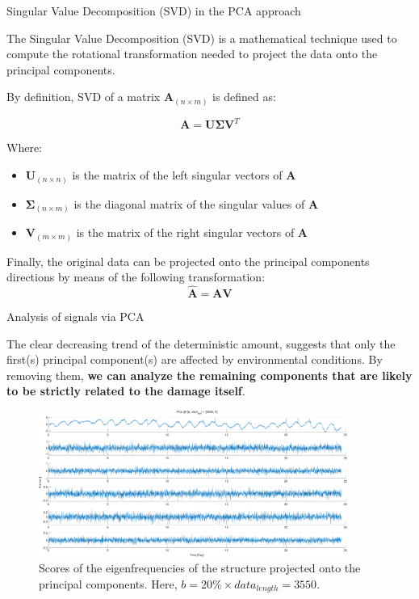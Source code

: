 \begin{frame}{Singular Value Decomposition (SVD) in the PCA approach}

    The Singular Value Decomposition (SVD) is a mathematical technique used to compute the rotational transformation needed to project the data onto the principal components.

    By definition, SVD of a matrix $\mathbf{A}_{(n \times m)}$ is defined as:

    \begin{equation}
        \mathbf{A} = \mathbf{U} \mathbf{\Sigma} \mathbf{V}^T
    \end{equation}

    Where:
    \begin{itemize}
        \item $\mathbf{U}_{(n \times n)}$ is the matrix of the left singular vectors of $\mathbf{A}$
        \item $\mathbf{\Sigma}_{(n \times m)}$ is the diagonal matrix of the singular values of $\mathbf{A}$
        \item $\mathbf{V}_{(m \times m)}$ is the matrix of the right singular vectors of $\mathbf{A}$
    \end{itemize}

    \vspace{9pt}

    Finally, the original data can be projected onto the principal components directions by means of the following transformation:
    \begin{equation}
        \mathbf{\hat{A}} = \mathbf{A} \mathbf{V}
    \end{equation}

\end{frame}



\begin{frame}{Analysis of signals via PCA}

    The clear decreasing trend of the deterministic amount, suggests that only the first(s) principal component(s) are affected by environmental conditions.
    By removing them, \textbf{we can analyze the remaining components that are likely to be strictly related to the damage itself}.

    \begin{figure}
        \centering
        \includegraphics[width=0.9\textwidth]{img/MATLAB/PCs_01.pdf}
        \caption{Scores of the eigenfrequencies of the structure projected onto the principal components. Here, $b = 20\% \times data_{length} = 3550$.}
    \end{figure}

\end{frame}
